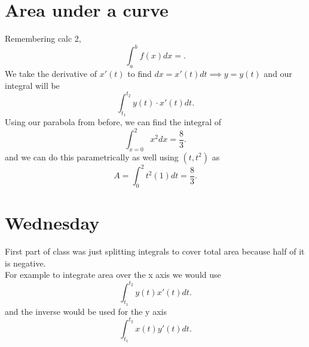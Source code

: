 \section{Area under a curve}%
\label{sec:Area under a curve}
Remembering calc 2,
\[
\int_{ a }^{ b } f\left( x \right) dx=
.\] 
We take the derivative of $ x'\left( t \right)  $ to find $ dx=x'\left( t \right) dt \implies y=y\left( t \right)  $ and our integral will be
\[
\int_{ t_1 }^{ t_2 } y\left( t \right) \cdot x'\left( t \right) dt
.\] 
Using our parabola from before, we can find the integral of 
\[
\int_{ x=0 }^{ 2 } x^2dx = \frac{ 8 }{ 3 } 
.\] 
and we can do this parametrically as well using $ \left( t,t^2 \right)  $ as
\[
A=\int_{ 0 }^{ 2 } t^2\left( 1 \right) dt=\frac{ 8 }{ 3 } 
.\] 
\section{Wednesday}%
\label{sec:Wednesday}
First part of class was just splitting integrals to cover total area because half of it is negative. \\
For example to integrate area over the x axis we would use
\[
\int_{ t_1 }^{ t_2 } y\left( t \right) x'\left( t \right) dt
.\] 
and the inverse would be used for the y axis
\[
\int_{ t_1 }^{ t_2 } x\left( t \right) y'\left( t \right) dt
.\] 

